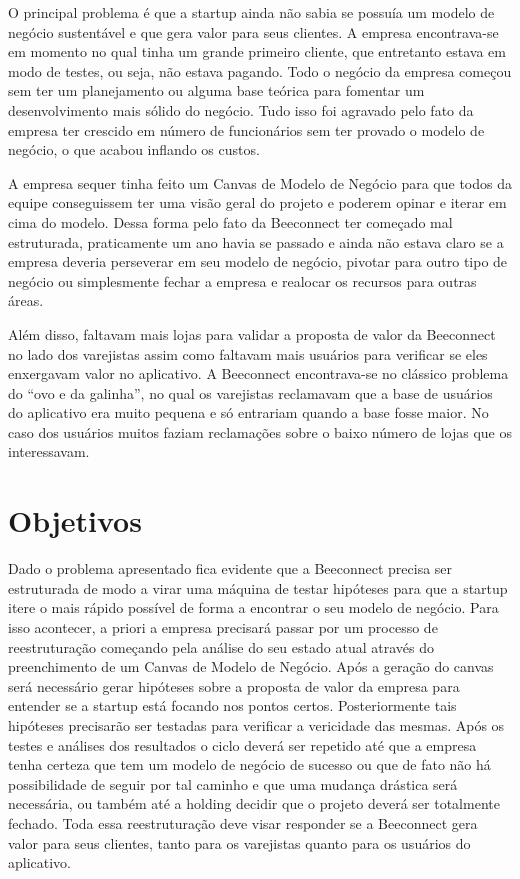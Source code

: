 O principal problema é que a startup ainda não sabia se possuía um modelo de negócio sustentável e que gera valor para seus clientes. A empresa encontrava-se em momento no qual tinha um grande primeiro cliente, que entretanto estava em modo de testes, ou seja, não estava pagando.
Todo o negócio da empresa começou sem ter um planejamento ou alguma base teórica para fomentar um desenvolvimento mais sólido do negócio. Tudo isso foi agravado pelo fato da empresa ter crescido em número de funcionários sem ter provado o modelo de negócio, o que acabou inflando os custos.

A empresa sequer tinha feito um Canvas de Modelo de Negócio para que todos da equipe conseguissem ter uma visão geral do projeto e poderem opinar e iterar em cima do modelo. Dessa forma pelo fato da Beeconnect ter começado mal estruturada, praticamente um ano havia se passado e ainda não estava claro se a empresa deveria perseverar em seu modelo de negócio, pivotar para outro tipo de negócio ou simplesmente fechar a empresa e realocar os recursos para outras áreas.

Além disso, faltavam mais lojas para validar a proposta de valor da Beeconnect no lado dos varejistas assim como faltavam mais usuários para verificar se eles enxergavam valor no aplicativo. A Beeconnect encontrava-se no clássico problema do \enquote{ovo e da galinha}, no qual os varejistas reclamavam que a base de usuários do aplicativo era muito pequena e só entrariam quando a base fosse maior. No caso dos usuários muitos faziam reclamações sobre o baixo número de lojas que os interessavam.

\section[Objetivos]{Objetivos}
\label{chap:objetivos}
Dado o problema apresentado fica evidente que a Beeconnect precisa ser estruturada de modo a virar uma máquina de testar hipóteses para que a startup itere o mais rápido possível de forma a encontrar o seu modelo de negócio. Para isso acontecer, a priori a empresa precisará passar por um processo de reestruturação começando pela análise do seu estado atual através do preenchimento de um Canvas de Modelo de Negócio. Após a geração do canvas será necessário gerar hipóteses sobre a proposta de valor da empresa para entender se a startup está focando nos pontos certos. Posteriormente tais hipóteses precisarão ser testadas para verificar a vericidade das mesmas. Após os testes e análises dos resultados o ciclo deverá ser repetido até que a empresa tenha certeza que tem um modelo de negócio de sucesso ou que de fato não há possibilidade de seguir por tal caminho e que uma mudança drástica será necessária, ou também até a holding decidir que o projeto deverá ser totalmente fechado.
Toda essa reestruturação deve visar responder se a Beeconnect gera valor para seus clientes, tanto para os varejistas quanto para os usuários do aplicativo. 

